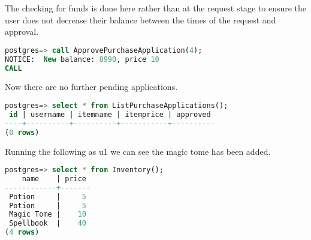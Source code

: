 The checking for funds is done here rather than at the request stage to ensure the user does not decrease their balance between
the times of the request and approval.

\begin{lstlisting}[language=SQL]
postgres=> call ApprovePurchaseApplication(4);
NOTICE:  New balance: 8990, price 10
CALL
\end{lstlisting}

Now there are no further pending applications.

\begin{lstlisting}[language=SQL]
postgres=> select * from ListPurchaseApplications();
 id | username | itemname | itemprice | approved 
----+----------+----------+-----------+----------
(0 rows)
\end{lstlisting}

Running the following as u1 we can see the magic tome has been added.

\begin{lstlisting}[language=SQL]
postgres=> select * from Inventory();
    name    | price 
------------+-------
 Potion     |     5
 Potion     |     5
 Magic Tome |    10
 Spellbook  |    40
(4 rows)
\end{lstlisting}


